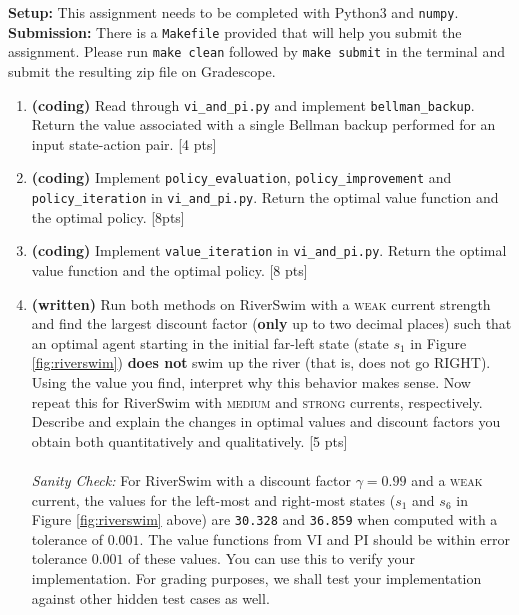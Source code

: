 \documentclass[11pt]{article}
\begin{document}
\noindent \textbf{Setup:} This assignment needs to be completed with Python3 and \texttt{numpy}. 
\\

\noindent \textbf{Submission:} There is a \texttt{Makefile} provided that will help you submit the assignment. Please run \texttt{make clean} followed by \texttt{make submit} in the terminal and submit the resulting zip file on Gradescope.

\begin{enumerate}[label=(\alph*)]
\item \textbf{(coding)} Read through \texttt{vi\_and\_pi.py} and implement \texttt{bellman\_backup}. Return the value associated with a single Bellman backup performed for an input state-action pair. [4 pts]\\


\item \textbf{(coding)} Implement \texttt{policy\_evaluation}, \texttt{policy\_improvement} and \texttt{policy\_iteration} in  \texttt{vi\_and\_pi.py}. Return the optimal value function and the optimal policy. [8pts]\\


\item \textbf{(coding)} Implement \texttt{value\_iteration} in \texttt{vi\_and\_pi.py}. Return the optimal value function and the optimal policy. [8 pts]\\


\item \textbf{(written)} Run both methods on RiverSwim with a \textsc{weak} current strength and find the largest discount factor (\textbf{only} up to two decimal places) such that an optimal agent starting in the initial far-left state (state $s_1$ in Figure \ref{fig:riverswim}) \textbf{does not} swim up the river (that is, does not go \textsc{RIGHT}). Using the value you find, interpret why this behavior makes sense. Now repeat this for RiverSwim with \textsc{medium} and \textsc{strong} currents, respectively. Describe and explain the changes in optimal values and discount factors you obtain both quantitatively and qualitatively. [5 pts]\\ \\
\textit{Sanity Check:} For RiverSwim with a discount factor $\gamma = 0.99$ and a \textsc{weak} current, the values for the left-most and right-most states ($s_1$ and $s_6$ in Figure \ref{fig:riverswim} above) are \texttt{30.328} and \texttt{36.859} when computed with a tolerance of $0.001$. The value functions from VI and PI should be within error tolerance $0.001$ of these values. You can use this to verify your implementation. For grading purposes, we shall test your implementation against other hidden test cases as well.
 
\begin{tcolorbox}[breakable]

\end{tcolorbox}

\end{enumerate}
\end{document}
